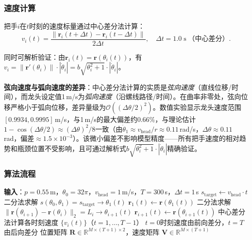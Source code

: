 \documentclass[12pt]{ctexart}
\begin{document}
\subsubsection{速度计算}

把手$i$在$t$时刻的速度标量通过中心差分法计算：
\begin{equation}
v_i(t) = \frac{\|\bm{r}_i(t+\Delta t) - \bm{r}_i(t-\Delta t)\|}{2\Delta t},\quad \Delta t=1.0\;\text{s}\;\text{（中心差分）}.
\label{eq:velocity}
\end{equation}

同时可解析验证：由$\bm{r}_i(t)=\bm{r}(\theta_i(t))$，有$v_i = \|\bm{r}'(\theta_i)\|\cdot|\dot{\theta}_i| = b\sqrt{\theta_i^2+1}\cdot|\dot{\theta}_i|$。

\textbf{弦向速度与弧向速度的差异}：中心差分法计算的实质是\textit{弦向速度}（直线位移/时间），而龙头设定值1\,m/s为\textit{弧向速度}（沿螺线路径/时间）。在曲率非零处，弦向位移严格小于弧向位移，差异量级为$\mathcal{O}((\Delta\theta/2)^2)$。数值实验显示龙头速度范围$[0.9934,0.9995]$\,m/s，与1\,m/s的最大偏差约0.66\%，与理论估计$1-\cos(\Delta\theta/2)\approx (\Delta\theta)^2/8$一致（由$\dot{\theta}_1\approx v_{\text{head}}/r\approx 0.11$\,rad/s，$\Delta\theta\approx 0.11$\,rad，偏差$\approx 1.5\times 10^{-3}$）。该微小偏差不影响模型精度——所有把手速度的相对趋势和瓶颈位置不受影响，且可通过解析式$b\sqrt{\theta_i^2+1}\cdot|\dot{\theta}_i|$精确验证。

\subsubsection{算法流程}

\begin{algorithm}[htbp]
\caption{问题一：盘入运动学正解}
\begin{algorithmic}[1]
\State \textbf{输入}：$p=0.55$\,m，$\theta_0=32\pi$，$v_{\text{head}}=1$\,m/s，$T=300$\,s，$\Delta t=1$\,s
  \State $s_{\text{target}} \gets v_{\text{head}} \cdot t$
  \State 二分法求解 $s(\theta_0,\theta_1) = s_{\text{target}} \to \theta_1(t)$
  \State $\bm{r}_1(t) \gets \bm{r}(\theta_1(t))$
    \State 二分法求解 $\|\bm{r}(\theta_{i+1})-\bm{r}(\theta_i)\|_2 = L_i \to \theta_{i+1}(t)$
    \State $\bm{r}_{i+1}(t) \gets \bm{r}(\theta_{i+1}(t))$
  \EndFor
\EndFor
\State 中心差分法计算各时刻速度 $\{v_i(t)\}$（$t=1,\dots,T-1$）
\State $t=0$时刻速度由前向差分，$t=T$由后向差分
\State \Return 位置矩阵 $\bm{R}\in\mathbb{R}^{M\times (T+1)\times 2}$，速度矩阵 $\bm{V}\in\mathbb{R}^{M\times (T+1)}$
\end{algorithmic}
\label{alg:q1}
\end{algorithm}
\end{document}
